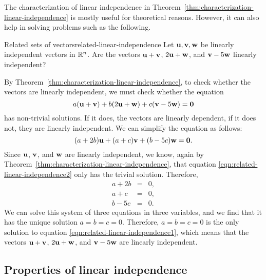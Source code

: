 The characterization of linear independence in
Theorem~\ref{thm:characterization-linear-independence} is mostly
useful for theoretical reasons. However, it can also help in solving
problems such as the following.

\begin{example}{Related sets of vectors}{related-linear-independence}
  Let $\mbox{\bf u},\mbox{\bf v},\mbox{\bf w}$ be linearly independent
  vectors in $\mathbb{R}^n$. Are the vectors
  $\mbox{\bf u}+\mbox{\bf v}$, $2\mbox{\bf u}+\mbox{\bf w}$, and $\mbox{\bf v}-5\mbox{\bf w}$
  linearly independent?
\end{example}

\begin{solution}
  By Theorem~\ref{thm:characterization-linear-independence}, to check
  whether the vectors are linearly independent, we must check whether
  the equation
  \begin{equation}\label{eqn:related-linear-independence1}
    a(\mbox{\bf u}+\mbox{\bf v}) + b(2\mbox{\bf u}+\mbox{\bf w}) +
    c(\mbox{\bf v}-5\mbox{\bf w})=\mbox{\bf 0}
  \end{equation}
  has non-trivial solutions.  If it does, the vectors are linearly
  dependent, if it does not, they are linearly independent. We can
  simplify the equation as follows:
  \begin{equation}\label{eqn:related-linear-independence2}
    (a+2b)\mbox{\bf u} + (a+c)\mbox{\bf v} + (b-5c)\mbox{\bf w}=\mbox{\bf 0}.
  \end{equation}
  Since $\mbox{\bf u}$, $\mbox{\bf v}$, and $\mbox{\bf w}$ are linearly
  independent, we know, again by
  Theorem~\ref{thm:characterization-linear-independence}, that
  equation {\eqref{eqn:related-linear-independence2}} only has the
  trivial solution. Therefore,
  \begin{eqnarray*}
    a + 2b & = & 0, \\
    a + c & = & 0, \\
    b - 5c & = & 0. 
  \end{eqnarray*}
  We can solve this system of three equations in three variables, and
  we find that it has the unique solution $a=b=c=0$. Therefore,
  $a=b=c=0$ is the only solution to equation
  {\eqref{eqn:related-linear-independence1}}, which means that the
  vectors $\mbox{\bf u}+\mbox{\bf v}$, $2\mbox{\bf u}+\mbox{\bf w}$, and
  $\mbox{\bf v}-5\mbox{\bf w}$ are linearly independent.
\end{solution}

\subsection{Properties of linear independence}

